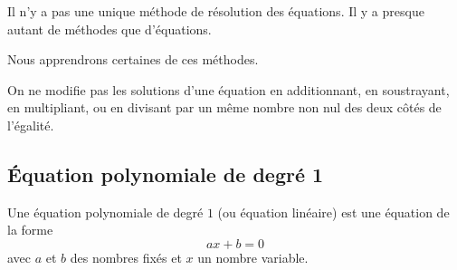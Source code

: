 \documentclass[a4paper,10pt]{report}
\begin{document}
\medskip
Il n'y a pas une unique méthode de résolution des équations. Il y a presque autant de méthodes que d'équations.

\noindent Nous apprendrons certaines de ces méthodes.

\begin{prop}
On ne modifie pas les solutions d'une équation en additionnant, en soustrayant, en multipliant, ou en divisant par un même nombre non nul des deux côtés de l'égalité.
\end{prop}
 

\subsection{Équation polynomiale de degré 1}

\begin{defn}
Une équation polynomiale de degré $1$ (ou équation linéaire) est une équation de la forme \[ ax+b=0 \]
avec $a$ et $b$ des nombres fixés et $x$ un nombre variable.
\end{defn}
\end{document}

